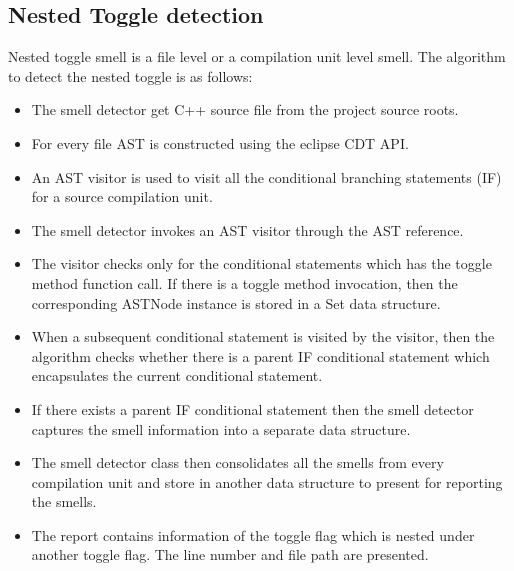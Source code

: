 \documentclass[conference]{IEEEtran}
\begin{document}
\subsection{Nested Toggle detection}
Nested toggle smell is a file level or a compilation unit level smell. The algorithm to detect the nested toggle is as follows:
\begin{itemize}
  	\item The smell detector get C++ source file from the project source roots.
  	\item For every file AST is constructed using the eclipse CDT API.
	\item An AST visitor is used to visit all the conditional branching statements (IF) for a source compilation unit.
	\item The smell detector invokes an AST visitor through the AST reference.
	\item The visitor checks only for the conditional statements which has the toggle method function call.
If there is a toggle method invocation, then the corresponding ASTNode instance is stored in a Set data structure.
	\item When a subsequent conditional statement is visited by the visitor, then the algorithm checks whether there is a parent IF conditional statement which encapsulates the current conditional statement.
	\item If there exists a parent IF conditional statement then the smell detector captures the smell information into a separate data structure.
	\item The smell detector class then consolidates all the smells from every compilation unit and store in another data structure to present for reporting the smells.
	\item The report contains information of the toggle flag which is nested under another toggle flag. The line number and file path are presented.
\end{itemize}
\end{document}
